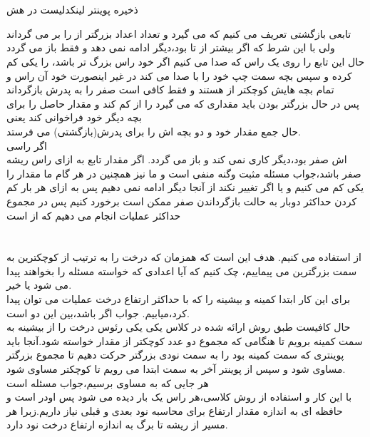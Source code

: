 \documentclass[a4paper]{article}
\begin{document}
\newpage

\section*{}	

\newpage


\section*{}
ذخیره پوینتر لینکدلیست در هش


تابعی بازگشتی تعریف می کنیم که 
می گیرد و تعداد اعداد بزرگتر از 
را بر می گرداند ولی با این شرط که اگر بیشتر از 
تا بود،دیگر ادامه نمی دهد و فقط باز می گردد\\
حال این تابع را روی یک راس که صدا می کنیم اگر خود راس بزرگ تر باشد،
را یکی کم کرده و سپس بچه سمت چپ خود را با
صدا می کند
در غیر اینصورت خود آن راس و تمام بچه هایش کوچکتر از
هستند و فقط کافی است صفر را به پدرش بازگرداند\\
پس در حال بزرگتر بودن باید
مقداری که می گیرد را از 
کم کند
و مقدار حاصل را برای بچه دیگر خود فراخوانی  کند
یعنی
\\
حال جمع مقدار خود و دو بچه اش را برای پدرش(بازگشتی) می فرستد.\\
اگر راسی
\\اش صفر بود،دیگر کاری نمی کند و باز می گردد.
اگر مقدار تابع به ازای راس ریشه صفر باشد،جواب مسئله مثبت وگنه منفی است و ما نیز 
همچنین در هر گام ما مقدار 
را یکی کم می کنیم و یا اگر تغییر نکند از آنجا دیگر ادامه نمی دهیم
پس به ازای هر بار کم کردن حداکثر دوبار به حالت بازگرداندن صفر ممکن است برخورد کنیم
پس در مجموع حداکثر 
عملیات انجام می دهیم
که از 
است
\newpage
\section*{}
از
استفاده می کنیم. هدف این است که همزمان که درخت را به ترتیب از کوچکترین به سمت بزرگترین می پیماییم، چک کنیم که آیا اعدادی که خواسته مسئله را بخواهند پیدا می شود یا خیر.\\
برای این کار ابتدا کمینه و بیشینه را که با حداکثر ارتفاع درخت عملیات می توان پیدا کرد،میابیم.
جواب اگر باشد،بین این دو است.\\
حال کافیست طبق روش ارائه شده در کلاس یکی یکی رئوس درخت را از بیشینه به سمت کمینه برویم تا هنگامی که مجموع دو عدد کوچکتر از مقدار خواسته شود.آنجا باید پوینتری که سمت کمینه بود را به سمت نودی بزرگتر حرکت دهیم تا مجموع بزرگتر مساوی شود و سپس از پوینتر آخر به سمت ابتدا می رویم تا کوچکتر مساوی شود.\\
هر جایی که به مساوی برسیم،جواب مسئله است\\
با این کار و استفاده از روش کلاسی،هر راس یک بار دیده می شود پس اودر 
است و حافظه ای به اندازه مقدار ارتفاع برای محاسبه نود بعدی و قبلی نیاز داریم.زبرا هر مسیر از ریشه تا برگ به اندازه ارتفاع درخت نود دارد.


\newpage
\end{document}
